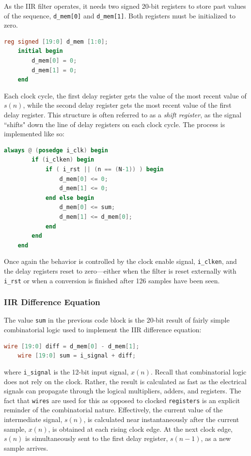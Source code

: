 \documentclass[reprint,amsmath,amssymb,aps,pra]{revtex4-2}
\begin{document}
As the IIR filter operates, it needs two signed 20-bit registers to store past values of the sequence, \verb|d_mem[0]| and \verb|d_mem[1]|. Both registers must be initialized to zero.
\begin{minipage}{\linewidth}
\begin{lstlisting}[language=Verilog]
    reg signed [19:0] d_mem [1:0];
    initial begin
        d_mem[0] = 0;
        d_mem[1] = 0;
    end
\end{lstlisting}
\end{minipage}

Each clock cycle, the first delay register gets the value of the most recent value of $s(n)$, while the second delay register gets the most recent value of the first delay register. This structure is often referred to as a \textit{shift register}, as the signal ``shifts" down the line of delay registers on each clock cycle. The process is implemented like so:
\begin{minipage}{\linewidth}
    \begin{lstlisting}[language=Verilog]
    always @ (posedge i_clk) begin
        if (i_clken) begin
            if ( i_rst || (n == (N-1)) ) begin
                d_mem[0] <= 0;
                d_mem[1] <= 0;
            end else begin
                d_mem[0] <= sum;
                d_mem[1] <= d_mem[0];
            end
        end
    end
\end{lstlisting}
\end{minipage}


 Once again the behavior is controlled by the clock enable signal, \verb|i_clken|, and the delay registers reset to zero---either when the filter is reset externally with \verb|i_rst| or when a conversion is finished after 126 samples have been seen. 

\subsubsection{IIR Difference Equation}
 
 The value \verb|sum| in the previous code block is the 20-bit result of fairly simple combinatorial logic used to implement the IIR difference equation:

\begin{lstlisting}[language=Verilog]
    wire [19:0] diff = d_mem[0] - d_mem[1];
    wire [19:0] sum = i_signal + diff;
\end{lstlisting}
where \verb|i_signal| is the 12-bit input signal, $x(n)$. Recall that combinatorial logic does not rely on the clock. Rather, the result is calculated as fast as the electrical signals can propagate through the logical multipliers, adders, and registers. The fact that \verb|wires| are used for this as opposed to clocked \verb|registers| is an explicit reminder of the combinatorial nature. Effectively, the current value of the intermediate signal, $s(n)$, is calculated near instantaneously after the current sample, $x(n)$, is obtained at each rising clock edge. At the next clock edge, $s(n)$ is simultaneously sent to the first delay register, $s(n-1)$, as a new sample arrives.
\end{document}

